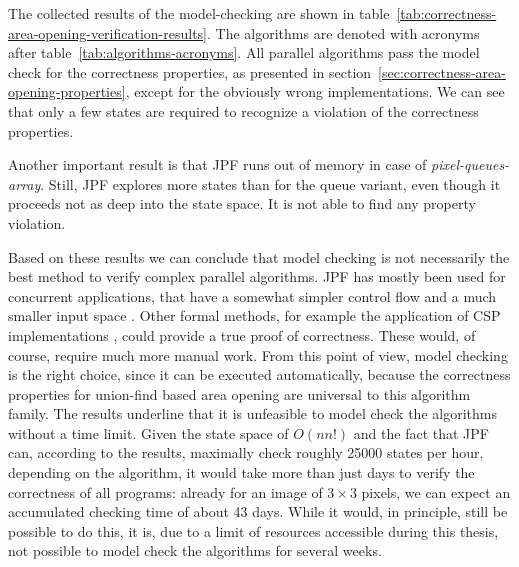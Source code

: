 The collected results of the model-checking are shown in
table~\ref{tab:correctness-area-opening-verification-results}. The algorithms
are denoted with acronyms after table~\ref{tab:algorithms-acronyms}. All
parallel algorithms pass the model check for the correctness properties, as
presented in section~\ref{sec:correctness-area-opening-properties}, except for
the obviously wrong implementations. We can see that only a few states are
required to recognize a violation of the correctness properties.

Another important result is that JPF runs out of memory in case of
\emph{pixel-queues-array}. Still, JPF explores more states than for the
\citet{Michael1996Simple} queue variant, even though it proceeds not as deep
into the state space. It is not able to find any property violation.

Based on these results we can conclude that model checking is not necessarily
the best method to verify complex parallel algorithms. JPF has mostly been used
for concurrent applications, that have a somewhat simpler control flow and a
much smaller input space \cite{Visser2003Model, Khurshid2003Generalized}. Other
formal methods, for example the application of CSP implementations
\cite{Hoare1978Communicating, Roscoe1997Theory}, could provide a true proof of
correctness. These would, of course, require much more manual work. From this
point of view, model checking is the right choice, since it can be executed
automatically, because the correctness properties for union-find based area
opening are universal to this algorithm family. The results underline that it is
unfeasible to model check the algorithms without a time limit. Given the state
space of $O(nn!)$ and the fact that JPF can, according to the results, maximally
check roughly 25000 states per hour, depending on the algorithm, it would take
more than just days to verify the correctness of all programs: already for an
image of $3 \times 3$ pixels, we can expect an accumulated checking time of
about 43 days. While it would, in principle, still be possible to do this, it
is, due to a limit of resources accessible during this thesis, not possible to
model check the algorithms for several weeks.

